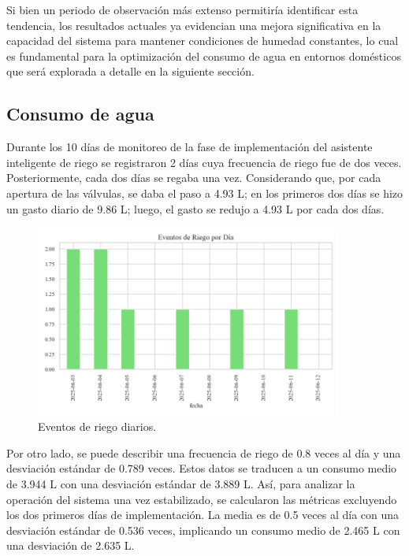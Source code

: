 \documentclass[pdflatex,sn-mathphys-num]{sn-jnl}%
\theoremstyle{thmstyleone}%
\theoremstyle{thmstyletwo}%
\theoremstyle{thmstylethree}%
\begin{document}
Si bien un periodo de observación más extenso permitiría identificar esta tendencia, los resultados actuales ya evidencian una mejora significativa en la capacidad del sistema para mantener condiciones de humedad constantes, lo cual es fundamental para la optimización del consumo de agua en entornos domésticos que será explorada a detalle en la siguiente sección.

\subsection{Consumo de agua}
Durante los 10 días de monitoreo de la fase de implementación del asistente inteligente de riego se registraron 2 días cuya frecuencia de riego fue de dos veces. Posteriormente, cada dos días se regaba una vez. 
Considerando que, por cada apertura de las válvulas, se daba el paso a 4.93 L; en los primeros dos días se hizo un gasto diario de 9.86 L; luego, el gasto se redujo a 4.93 L por cada dos días. 

\begin{figure}
  \centering
  \includegraphics[width=0.9\textwidth]{assets/eventos_por_dia.png}
  \caption{Eventos de riego diarios.}
  \label{fig5}
\end{figure}

Por otro lado, se puede describir una frecuencia de riego de 0.8 veces al día y una desviación estándar de 0.789 veces. Estos datos se traducen a un consumo medio de 3.944 L con una desviación estándar de 3.889 L. 
Así, para analizar la operación del sistema una vez estabilizado, se calcularon las métricas excluyendo los dos primeros días de implementación. La media es de 0.5 veces al día con una desviación estándar de 0.536 veces, implicando un consumo medio de 2.465 L con una desviación de 2.635 L.
\end{document}
